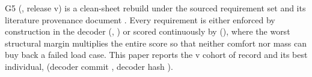 G5 (, release v\gVersion) is a clean-sheet rebuild under the sourced requirement
set  and its literature provenance document
. Every requirement is either enforced by construction in the
 decoder (, )
or scored continuously by  (), where the worst
structural margin multiplies the entire score so that neither comfort nor mass can buy back a failed load case. This paper
reports the v\gRecord{} cohort of record and its best individual, \gDesign{} (decoder commit \gCommit, decoder hash
\gDecoder).
